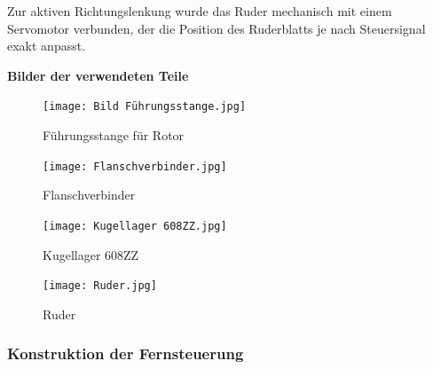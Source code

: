 \documentclass[a4paper,12pt]{article}
\begin{document}
Zur aktiven Richtungslenkung wurde das Ruder mechanisch mit einem Servomotor verbunden, der die Position des Ruderblatts je nach Steuersignal exakt anpasst.

\newpage

\textbf{Bilder der verwendeten Teile}



\begin{figure}[H]
    \centering
    \begin{minipage}[b]{0.35\linewidth}
        \centering
        \texttt{[image: Bild Führungsstange.jpg]}
        \caption{Führungsstange für Rotor\cite{Führungsstange_Rotor}}
        \label{fig:Fuehrungsstange}
    \end{minipage}
    \hspace{2.5em}  
    \begin{minipage}[b]{0.42\linewidth}
        \centering
        \texttt{[image: Flanschverbinder.jpg]}
        \caption{Flanschverbinder\cite{Flanschverbinder}}
        \label{fig:Flanschverbinder}
    \end{minipage}
\end{figure}




\begin{figure}[H]
    \centering
    \begin{minipage}[b]{0.30\linewidth}
        \centering
        \texttt{[image: Kugellager 608ZZ.jpg]}
        \caption{Kugellager 608ZZ\cite{Kugellager}}
        \label{fig:Kugellager}
    \end{minipage}
    \hspace{2.5em}  
    \begin{minipage}[b]{0.40\linewidth}
        \centering
        \texttt{[image: Ruder.jpg]}
        \caption{Ruder\cite{Ruder}}
        \label{fig:Ruder}
    \end{minipage}
\end{figure}

\subsubsection{Konstruktion der Fernsteuerung}
\end{document}
